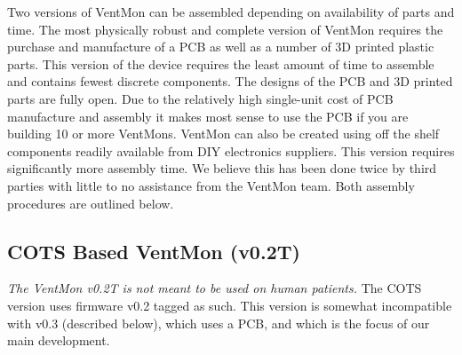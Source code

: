 \documentclass[11pt, letterpaper]{article}
\begin{document}
Two versions of VentMon can be assembled depending on availability of parts and time. The most physically robust and complete version of VentMon requires the purchase and manufacture of a PCB as well as a number of 3D printed plastic parts. This version of the device requires the least amount of time to assemble and contains fewest discrete components. The designs of the PCB and 3D printed parts are fully open. Due to the relatively high single-unit cost of PCB manufacture and assembly it makes most sense to use the PCB if you are building 10 or more VentMons. VentMon can also be created using off the shelf components readily available from DIY electronics suppliers. This version requires significantly more assembly time. We believe this has been done twice by third parties with little to no assistance from the VentMon team. Both assembly procedures are outlined below.

\subsection{COTS Based VentMon (v0.2T)}

{\em The VentMon v0.2T is not meant to be used on human patients. }
The COTS version uses firmware v0.2 tagged as such\cite{VentMon02}. This version is somewhat incompatible
with v0.3 (described below), which uses a PCB, and which is
the focus of our main development.
\end{document}
